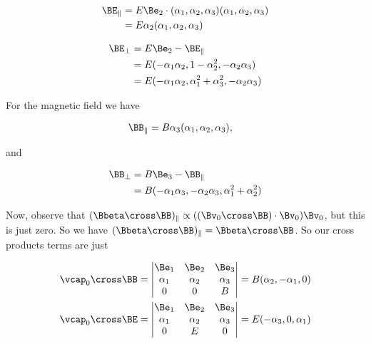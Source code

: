 \begin{align*}
\BE_\parallel 
&= E \Be_2 \cdot (\alpha_1, \alpha_2, \alpha_3) (\alpha_1, \alpha_2, \alpha_3) \\
&= E \alpha_2 (\alpha_1, \alpha_2, \alpha_3) \\
\end{align*}

\begin{align*}
\BE_\perp 
&= E \Be_2 - \BE_\parallel \\
&= E (-\alpha_1 \alpha_2, 1 - \alpha_2^2, -\alpha_2 \alpha_3) \\
&= E (-\alpha_1 \alpha_2, \alpha_1^2 + \alpha_3^2, -\alpha_2 \alpha_3) \\
\end{align*}

For the magnetic field we have

\begin{align*}
\BB_\parallel 
&= B \alpha_3 (\alpha_1, \alpha_2, \alpha_3),
\end{align*}

and

\begin{align*}
\BB_\perp 
&= B \Be_3 - \BB_\parallel \\
&= B (-\alpha_1 \alpha_3, -\alpha_2 \alpha_3, \alpha_1^2 + \alpha_2^2)  \\
\end{align*}

Now, observe that $(\Bbeta \cross \BB)_\parallel \propto ((\Bv_0 \cross \BB) \cdot \Bv_0) \Bv_0$, but this is just zero.  So we have $(\Bbeta \cross \BB)_\parallel = \Bbeta \cross \BB$.  So our cross products terms are just

\begin{align*}
\vcap_0 \cross \BB &= 
        \begin{vmatrix} 
        \Be_1 & \Be_2 & \Be_3 \\
        \alpha_1 & \alpha_2 & \alpha_3 \\
        0 & 0 & B 
        \end{vmatrix} 
= B (\alpha_2, -\alpha_1, 0) \\
\vcap_0 \cross \BE &= 
        \begin{vmatrix} 
        \Be_1 & \Be_2 & \Be_3 \\
        \alpha_1 & \alpha_2 & \alpha_3 \\
        0 & E & 0 
        \end{vmatrix} 
= E (-\alpha_3, 0, \alpha_1)
\end{align*}

